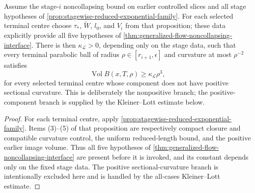 \begin{lemma}
\label{lem:reduced-volume-noncollapsing-transfer}
\notready
Assume the stage-$i$ noncollapsing bound on earlier controlled slices and all
stage hypotheses of
\ref{prop:stagewise-reduced-exponential-family}.  For each selected terminal
centre choose $\tau_*$, $\widetilde W$, $l_0$, and $V_i$ from that proposition;
these data explicitly provide all five hypotheses of
\ref{thm:generalized-flow-noncollapsing-interface}.  There is then
$\kappa_{\mathcal L}>0$, depending only on the stage data, such that every
terminal parabolic ball of radius
$\rho\in[r_{i+1},\epsilon]$ and curvature at most $\rho^{-2}$ satisfies
\[
 \operatorname{Vol}B(x,T,\rho)\ge\kappa_{\mathcal L}\rho^3,
\]
for every selected terminal centre whose component does not have positive
sectional curvature.  This is deliberately the nonpositive branch; the
positive-component branch is supplied by the Kleiner--Lott estimate below.
\end{lemma}

\begin{proof}
For each terminal centre, apply
\ref{prop:stagewise-reduced-exponential-family}.  Items (3)--(5) of that
proposition are respectively compact closure and compatible curvature control,
the uniform reduced-length bound, and the positive earlier image volume.
Thus all five hypotheses of
\ref{thm:generalized-flow-noncollapsing-interface} are present before it is
invoked, and its constant depends only on the fixed stage data.  The positive
sectional-curvature branch is intentionally excluded here and is handled by
the all-cases Kleiner--Lott estimate.
\end{proof}

